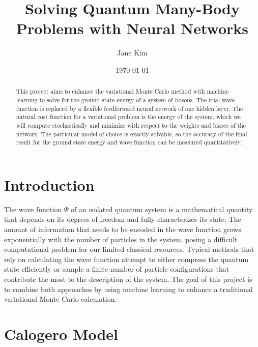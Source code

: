 \documentclass[prb,aps,twocolumn,showpacs,10pt]{revtex4-1}
\begin{document}
\title {Solving Quantum Many-Body Problems with Neural Networks}
\author{Jane Kim}
\date{\today}
\begin{abstract}
\vspace*{3mm}
This project aims to enhance the variational Monte Carlo method with machine learning to solve for the ground state energy of a system of bosons. The trial wave function is replaced by a flexible feedforward neural network of one hidden layer. The natural cost function for a variational problem is the energy of the system, which we will compute stochastically and minimize with respect to the weights and biases of the network. The particular model of choice is exactly solvable, so the accuracy of the final result for the ground state energy and wave function can be measured quantitatively. 
\end{abstract}

\maketitle


\section{Introduction}

The wave function $\Psi$ of an isolated quantum system is a mathematical quantity that depends on its degrees of freedom and fully characterizes its state. The amount of information that needs to be encoded in the wave function grows exponentially with the number of particles in the system, posing a difficult computational problem for our limited classical resources. Typical methods that rely on calculating the wave function attempt to either compress the quantum state efficiently or sample a finite number of particle configurations that contribute the most to the description of the system. The goal of this project is to combine both approaches by using machine learning to enhance a traditional variational Monte Carlo calculation. 


\section{Calogero Model}
\end{document}
